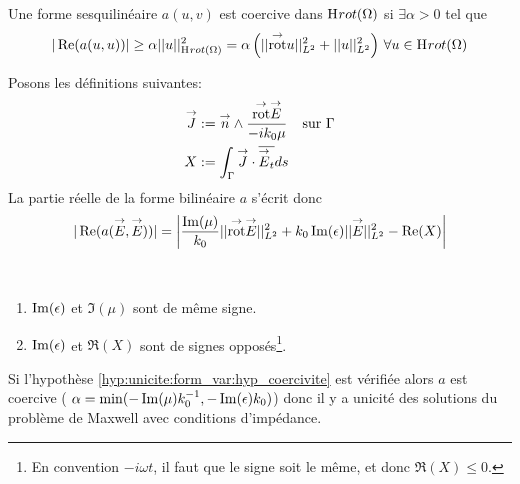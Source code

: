  \begin{defn}[Coercivité]
    Une forme sesquilinéaire \(a(u,v)\) est coercive dans \(\mathrm{H}_\mathrm{{}}{rot}(\Omega)\) si \(\exists \alpha > 0\) tel que
    \[
      |\operatorname{Re}(a(u,u))| \ge \alpha ||u||_{\mathrm{H}_\mathrm{{}}{rot}(\Omega)}^2 = \alpha \left( || {{\overset{\rightarrow}{\operatorname{rot}}}} u ||_{L^2}^2 + || u ||_{L^2}^2\right) \, \forall u \in \mathrm{H}_\mathrm{{}}{rot}(\Omega)
    \]
   \end{defn}


  Posons les définitions suivantes:
  \begin{align*}
    {\overset{\rightarrow}{J}} &:=  {\overset{\rightarrow}{n}} \wedge \dfrac{{{\overset{\rightarrow}{\operatorname{rot}}}} {\overset{\rightarrow}{E}}}{-ik_0\mu} && \text{sur \(\Gamma\)}
    \\
    X&:= \int_\Gamma {\overset{\rightarrow}{J}} \cdot {\overline{{\overset{\rightarrow}{E}}_t}} ds
  \end{align*}
  La partie réelle de la forme bilinéaire \(a\) s'écrit donc
  \begin{equation}
    \label{eq:unicite:form_var:decomp_form_bilin_1}
    |\operatorname{Re}(a({\overset{\rightarrow}{E}},{\overset{\rightarrow}{E}}))| = \left|\dfrac{\operatorname{Im}(\mu)}{k_0} || {{\overset{\rightarrow}{\operatorname{rot}}}} {\overset{\rightarrow}{E}} ||_{L^2}^2  + k_0 \operatorname{Im}(\epsilon) || {\overset{\rightarrow}{E}} ||_{L^2}^2
    - \operatorname{Re}(X)\right|
  \end{equation}

  \begin{hyp}\label{hyp:unicite:form_var:hyp_coercivite}
    ~{}

    \begin{enumerate}
      \item \(\operatorname{Im}(\epsilon)\) et \(\Im(\mu)\) sont de même signe.
      \item \(\operatorname{Im}(\epsilon)\) et \(\Re(X)\) sont de signes opposés\footnote{En convention \(-i\omega t\), il faut que le signe soit le même, et donc \(\Re(X) \le 0\).}.
    \end{enumerate}
  \end{hyp}

  Si l'hypothèse \ref{hyp:unicite:form_var:hyp_coercivite} est vérifiée alors \(a\) est coercive ( \(\alpha = \min(-\operatorname{Im}(\mu)k_0^{-1},-\operatorname{Im}(\epsilon)k_0)\)) donc il y a unicité des solutions du problème de Maxwell avec conditions d'impédance.

